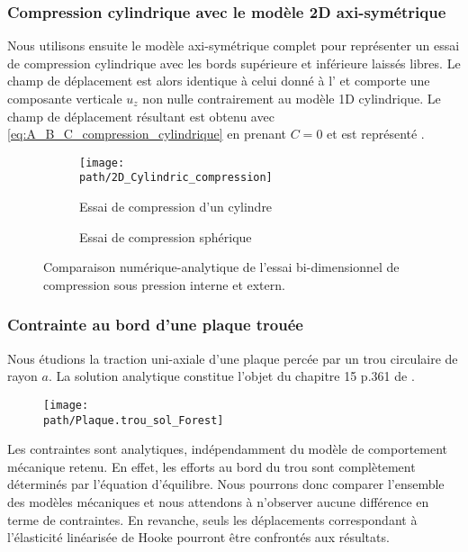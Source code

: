 \documentclass[10pt]{book}
\def\path{./fig}
\begin{document}
\subsubsection{Compression cylindrique avec le modèle 2D axi-symétrique}
Nous utilisons ensuite le modèle axi-symétrique complet pour représenter un essai de compression cylindrique avec les bords supérieure et inférieure laissés libres. Le champ de déplacement est alors identique à celui donné à l' et comporte une composante verticale $u_{z}$ non nulle contrairement au modèle 1D cylindrique. Le champ de déplacement résultant est obtenu avec \eqref{eq:A_B_C_compression_cylindrique} en prenant $C=0$ et est représenté .
\begin{figure}[h!]
\begin{subfigure}[b]{0.49\textwidth}
\centering \texttt{[image: \\path/2D\_Cylindric\_compression]}
\caption{Essai de compression d'un cylindre}
\label{fig:2D_Cylindric_compression}
\end{subfigure}
\begin{subfigure}[b]{0.49\textwidth}
\caption{Essai de compression sphérique}
\end{subfigure}
\caption{Comparaison numérique-analytique de l'essai bi-dimensionnel de compression sous pression interne et extern.}
\label{fig:2D_Cylindric_compression}
\end{figure}
\subsubsection{Contrainte au bord d'une plaque trouée}
Nous étudions la traction uni-axiale d'une plaque percée par un trou circulaire de rayon $a$. La solution analytique constitue l'objet du chapitre 15 p.361 de \cite{forest2015mecanique}.
\begin{figure}[h!]
\centering \texttt{[image: \\path/Plaque.trou\_sol\_Forest]}
\end{figure}
Les contraintes sont analytiques, indépendamment du modèle de comportement mécanique retenu. En effet, les efforts au bord du trou sont complètement déterminés par l'équation d'équilibre. Nous pourrons donc comparer l'ensemble des modèles mécaniques et nous attendons à n'observer aucune différence en terme de contraintes. En revanche, seuls les déplacements correspondant à l'élasticité linéarisée de Hooke pourront être confrontés aux résultats.
\end{document}

